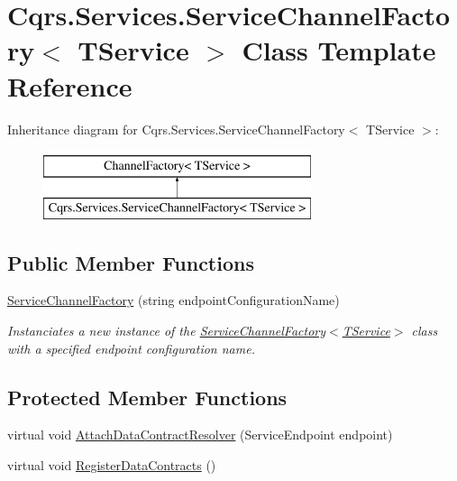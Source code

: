 \hypertarget{classCqrs_1_1Services_1_1ServiceChannelFactory}{}\section{Cqrs.\+Services.\+Service\+Channel\+Factory$<$ T\+Service $>$ Class Template Reference}
\label{classCqrs_1_1Services_1_1ServiceChannelFactory}
Inheritance diagram for Cqrs.\+Services.\+Service\+Channel\+Factory$<$ T\+Service $>$\+:\begin{figure}[H]
\begin{center}
\leavevmode
\includegraphics[height=2.000000cm]{classCqrs_1_1Services_1_1ServiceChannelFactory}
\end{center}
\end{figure}
\subsection*{Public Member Functions}
\begin{DoxyCompactItemize}
\item 
\hyperlink{classCqrs_1_1Services_1_1ServiceChannelFactory_a8b483162bcc271fa8212c72e13e28f55}{Service\+Channel\+Factory} (string endpoint\+Configuration\+Name)
\begin{DoxyCompactList}\small\item\em Instanciates a new instance of the \hyperlink{classCqrs_1_1Services_1_1ServiceChannelFactory_a8b483162bcc271fa8212c72e13e28f55}{Service\+Channel\+Factory$<$\+T\+Service$>$} class with a specified endpoint configuration name. \end{DoxyCompactList}\end{DoxyCompactItemize}
\subsection*{Protected Member Functions}
\begin{DoxyCompactItemize}
\item 
virtual void \hyperlink{classCqrs_1_1Services_1_1ServiceChannelFactory_a90572d83f68b4ba72687bb8c755b0845}{Attach\+Data\+Contract\+Resolver} (Service\+Endpoint endpoint)
\item 
virtual void \hyperlink{classCqrs_1_1Services_1_1ServiceChannelFactory_a0ef5c8298659383821b3b8901351db42}{Register\+Data\+Contracts} ()
\end{DoxyCompactItemize}


